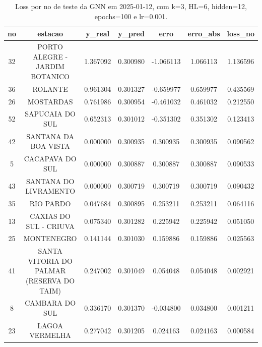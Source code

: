 \begin{table}[h]
\centering
\caption{Loss por no de teste da GNN em 2025-01-12, com k=3, HL=6, hidden=12, epochs=100 e lr=0.001.}
\label{tab:gnn_loss_k3_hl6_h12_e100_d20250112}
\begin{tabular}{ccccccc}
\toprule
no & estacao & y\_real & y\_pred & erro & erro\_abs & loss\_no \\
\midrule
32 & PORTO ALEGRE - JARDIM BOTANICO & 1.367092 & 0.300980 & -1.066113 & 1.066113 & 1.136596 \\
36 & ROLANTE & 0.961304 & 0.301327 & -0.659977 & 0.659977 & 0.435569 \\
26 & MOSTARDAS & 0.761986 & 0.300954 & -0.461032 & 0.461032 & 0.212550 \\
52 & SAPUCAIA DO SUL & 0.652313 & 0.301012 & -0.351302 & 0.351302 & 0.123413 \\
42 & SANTANA DA BOA VISTA & 0.000000 & 0.300935 & 0.300935 & 0.300935 & 0.090562 \\
5 & CACAPAVA DO SUL & 0.000000 & 0.300887 & 0.300887 & 0.300887 & 0.090533 \\
43 & SANTANA DO LIVRAMENTO & 0.000000 & 0.300719 & 0.300719 & 0.300719 & 0.090432 \\
35 & RIO PARDO & 0.047684 & 0.300895 & 0.253211 & 0.253211 & 0.064116 \\
13 & CAXIAS DO SUL - CRIUVA & 0.075340 & 0.301282 & 0.225942 & 0.225942 & 0.051050 \\
25 & MONTENEGRO & 0.141144 & 0.301030 & 0.159886 & 0.159886 & 0.025563 \\
41 & SANTA VITORIA DO PALMAR (RESERVA DO TAIM) & 0.247002 & 0.301049 & 0.054048 & 0.054048 & 0.002921 \\
8 & CAMBARA DO SUL & 0.336170 & 0.301370 & -0.034800 & 0.034800 & 0.001211 \\
23 & LAGOA VERMELHA & 0.277042 & 0.301205 & 0.024163 & 0.024163 & 0.000584 \\
\bottomrule
\end{tabular}
\end{table}
